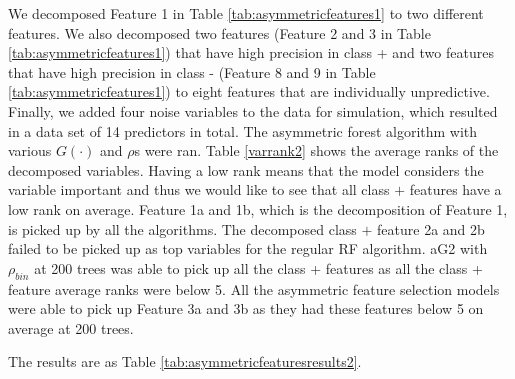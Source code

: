 \documentclass[twoside,11pt]{article}
\begin{document}
 We decomposed Feature 1 in Table \ref{tab:asymmetricfeatures1} to two different features. We also decomposed two features (Feature 2 and 3 in Table \ref{tab:asymmetricfeatures1}) that have high precision in class + and two features that have high precision in class - (Feature 8 and 9 in Table \ref{tab:asymmetricfeatures1}) to eight features that are individually unpredictive. Finally, we added four noise variables to the data for simulation, which resulted in a data set of 14 predictors in total. The asymmetric forest algorithm with various $G(\cdot)$ and $\rho$s were ran. Table \ref{varrank2} shows the average ranks of the decomposed variables. Having a low rank means that the model considers the variable important and thus we would like to see that all class $+$ features have a low rank on average. Feature 1a and 1b, which is the decomposition of Feature 1, is picked up by all the algorithms. The decomposed class  $+$ feature 2a and 2b failed to be picked up as top variables for the regular RF algorithm. aG2 with $\rho_{bin}$  at 200 trees was able to pick up all the class + features as all the class + feature average ranks were below 5. All the asymmetric feature selection models were able to pick up Feature 3a and 3b as they had these features below 5 on average at 200 trees. 

 The results are as Table \ref{tab:asymmetricfeaturesresults2}. 
\end{document}
